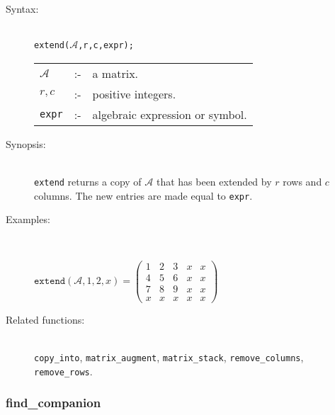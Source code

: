 \begin{description}
\item[Syntax:]\mbox{}\\
\texttt{extend($\mathcal{A}$,r,c,expr);}\\
\begin{tabular}{l l l}
$\mathcal{A}$ &:-& a matrix. \\
$r,c$              &:-& positive integers. \\
\texttt{expr}      &:-& algebraic expression or symbol.
\end{tabular}

\item[Synopsis:]\mbox{}\\
                \texttt{extend} returns a copy of $\mathcal{A}$ that has been 
                extended by $r$ rows and $c$ columns. The new entries are
                made equal to \texttt{expr}.

\item[Examples:]\mbox{}\\
\begin{flushleft}  
\begin{math}  
\texttt{extend}(\mathcal{A},1,2,x) =
\begin{pmatrix} 1 & 2 & 3 & x & x \\ 4 & 5 & 6 & x & x
\\ 7 & 8 & 9 & x & x \\ x & x & x & x & x 
\end{pmatrix}
\end{math}  
\end{flushleft}

\item[Related functions:]\mbox{}\\
\texttt{copy\_into}, \texttt{matrix\_augment}, 
\texttt{matrix\_stack}, \texttt{remove\_columns}, \texttt{remove\_rows}.

\end{description}


\subsubsection{find\_companion}
\label{linalg:find_companion}

